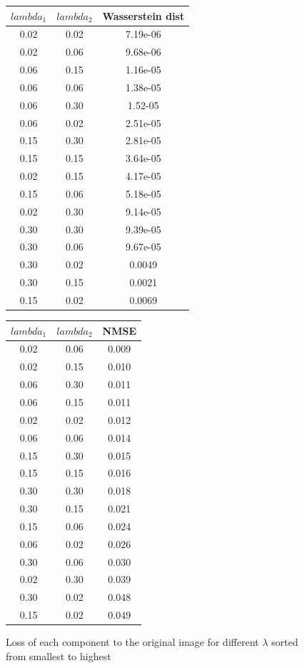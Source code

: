 \documentclass[a4paper,11pt,oneside]{report}
\theoremstyle{named}
\begin{document}
\begin{figure}
\begin{center}
\begin{tabular}{||c c c||}
 \hline
 $lambda_1$ & $lambda_2$ & Wasserstein dist\\ [0.5ex]
 \hline\hline
 0.02 & 0.02 & 7.19e-06\\
 0.02 & 0.06 & 9.68e-06 \\
 0.06 & 0.15 & 1.16e-05 \\
 0.06 & 0.06 & 1.38e-05 \\
 0.06 & 0.30 & 1.52-05 \\
 0.06 & 0.02 & 2.51e-05 \\
 0.15 & 0.30 & 2.81e-05 \\
 0.15 & 0.15 & 3.64e-05 \\
 0.02 & 0.15 & 4.17e-05 \\
 0.15 & 0.06 & 5.18e-05 \\
 0.02 & 0.30 & 9.14e-05 \\
 0.30 & 0.30 & 9.39e-05 \\
 0.30 & 0.06 & 9.67e-05 \\
 0.30 & 0.02 & 0.0049 \\
 0.30 & 0.15 & 0.0021 \\
 0.15 & 0.02 & 0.0069 \\
 [1ex]
 \hline
 \end{tabular}
 \hfil  
 \begin{tabular}{||c c c||}
 \hline
 $lambda_1$ & $lambda_2$ & NMSE\\ [0.5ex]
  \hline\hline
 0.02  & 0.06 & 0.009 \\
 0.02  & 0.15 & 0.010 \\
 0.06  & 0.30 & 0.011 \\
 0.06  & 0.15 & 0.011 \\
 0.02  & 0.02 & 0.012 \\
 0.06  & 0.06 & 0.014 \\
 0.15  & 0.30 & 0.015 \\
 0.15  & 0.15 & 0.016 \\
 0.30  & 0.30 & 0.018 \\
 0.30  & 0.15 & 0.021 \\
 0.15  & 0.06 & 0.024 \\
 0.06  & 0.02 & 0.026 \\
 0.30  & 0.06 & 0.030 \\
 0.02  & 0.30 & 0.039 \\
 0.30  & 0.02 & 0.048 \\
 0.15  & 0.02 & 0.049 \\
 [1ex]
 \hline
 \end{tabular}
\end{center}
    \caption{Loss of each component to the original image for different $\lambda$ sorted from smallest to highest}
    \label{lambda table}
\end{figure}
\end{document}
